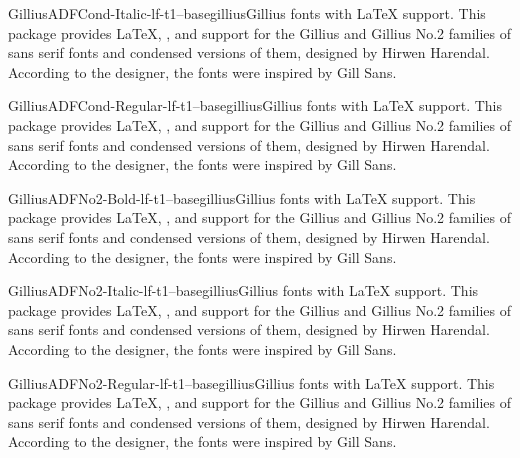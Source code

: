 \documentclass{ddltxtyp}
\begin{document}
\begin{package}{GilliusADFCond-Italic-lf-t1--base}{gillius}{Gillius fonts with {\LaTeX} support.}
This package provides {\LaTeX}, {\pdfLaTeX}, {\XeLaTeX} and {\LuaLaTeX}
support for the Gillius and Gillius No.2 families of sans
serif fonts and condensed versions of them, designed by Hirwen
Harendal. According to the designer, the fonts were inspired by
Gill Sans.
\end{package}

\begin{package}{GilliusADFCond-Regular-lf-t1--base}{gillius}{Gillius fonts with {\LaTeX} support.}
This package provides {\LaTeX}, {\pdfLaTeX}, {\XeLaTeX} and {\LuaLaTeX}
support for the Gillius and Gillius No.2 families of sans
serif fonts and condensed versions of them, designed by Hirwen
Harendal. According to the designer, the fonts were inspired by
Gill Sans.
\end{package}

\begin{package}{GilliusADFNo2-Bold-lf-t1--base}{gillius}{Gillius fonts with {\LaTeX} support.}
This package provides {\LaTeX}, {\pdfLaTeX}, {\XeLaTeX} and {\LuaLaTeX}
support for the Gillius and Gillius No.2 families of sans
serif fonts and condensed versions of them, designed by Hirwen
Harendal. According to the designer, the fonts were inspired by
Gill Sans.
\end{package}


\begin{package}{GilliusADFNo2-Italic-lf-t1--base}{gillius}{Gillius fonts with {\LaTeX} support.}
This package provides {\LaTeX}, {\pdfLaTeX}, {\XeLaTeX} and {\LuaLaTeX}
support for the Gillius and Gillius No.2 families of sans
serif fonts and condensed versions of them, designed by Hirwen
Harendal. According to the designer, the fonts were inspired by
Gill Sans.
\end{package}

\begin{package}{GilliusADFNo2-Regular-lf-t1--base}{gillius}{Gillius fonts with {\LaTeX} support.}
This package provides {\LaTeX}, {\pdfLaTeX}, {\XeLaTeX} and {\LuaLaTeX}
support for the Gillius and Gillius No.2 families of sans
serif fonts and condensed versions of them, designed by Hirwen
Harendal. According to the designer, the fonts were inspired by
Gill Sans.
\end{package}
\end{document}
